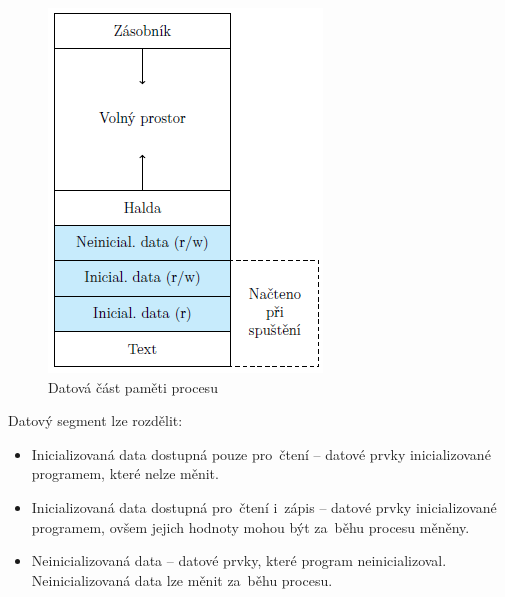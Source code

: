 \begin{figure}[H]
\begin{minipage}[b]{0.47\textwidth}
		\includegraphics[width=\textwidth]{images/proc_data_segment.png}
		\caption{Datová část paměti procesu}
		\label{proc_data_segment}
	\end{minipage}
\end{figure}

Datový segment lze rozdělit:

\begin{itemize}[noitemsep]
	\item Inicializovaná data dostupná pouze pro~čtení -- datové prvky inicializované programem,
	které nelze měnit.
	\item Inicializovaná data dostupná pro~čtení i~zápis -- datové prvky inicializované programem,
	ovšem jejich hodnoty mohou být za~běhu procesu měněny.
	\item Neinicializovaná data -- datové prvky, které program neinicializoval. Neinicializovaná data lze měnit za~běhu procesu.
\end{itemize}

